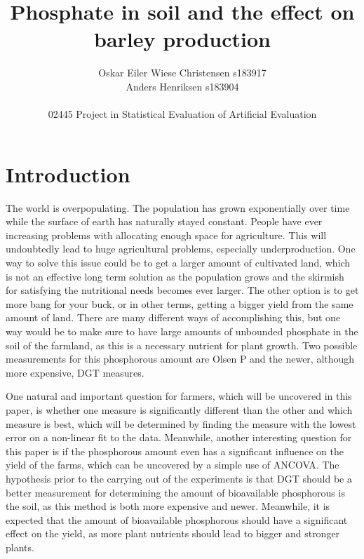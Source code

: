 \documentclass[11pt, fleqn, titlepage]{article}
\title{Phosphate in soil and the effect on barley production}
\author{Oskar Eiler Wiese Christensen s183917 \\ Anders Henriksen s183904 \\ \\ 02445 Project in Statistical Evaluation of Artificial Evaluation}
\date{\today \vspace{2.5cm} \section*{\small Summary} 
\justify{\footnotesize Farmers will need more effective agriculture as the population grows. This can be accomplished by optimizing the amount of bioavailable phosphorous in the soil. The purpose of this paper is to analyze two different measurements of phosphorous in the soil. The measurements are OlsenP and DGT. Furthermore, it is studied which measurement is better at describing the yield. A linear and non-linear Michaelis-Mentel model have been fit to the data to find the best possible measurement to use, and ANCOVA has been applied for finding the significance of phosphorous for the yield. These analyses have shown that DGT is the best of the two measurements and that phosphorous has a remarkably significant influence on the harvest yield. This shows that phosphorous measurements can be constructive in helping farmers estimate the yield. Meanwhile, when estimating this, DGT is the better of the measurements, though it also costs more, so farmers should take into consideration the cost-benefit of using DGT instead of OlsenP.}}
\begin{document}
\maketitle
\tableofcontents \newpage
\section{Introduction}
The world is overpopulating. The population has grown exponentially over time while the surface of earth has naturally stayed constant. People have ever increasing problems with allocating enough space for agriculture. This will undoubtedly lead to huge agricultural problems, especially underproduction. One way to solve this issue could be to get a larger amount of cultivated land, which is not an effective long term solution as the population grows and the skirmish for satisfying the nutritional needs becomes ever larger. The other option is to get more bang for your buck, or in other terms, getting a bigger yield from the same amount of land. There are many different ways of accomplishing this, but one way would be to make sure to have large amounts of unbounded phosphate in the soil of the farmland, as this is a necessary nutrient for plant growth. Two possible measurements for this phosphorous amount are Olsen P and the newer, although more expensive, DGT measures. 

One natural and important question for farmers, which will be uncovered in this paper, is whether one measure is significantly different than the other and which measure is best, which will be determined by finding the measure with the lowest error on a non-linear fit to the data. Meanwhile, another interesting question for this paper is if the phosphorous amount even has a significant influence on the yield of the farms, which can be uncovered by a simple use of ANCOVA. The hypothesis prior to the carrying out of the experiments is that DGT should be a better measurement for determining the amount of bioavailable phosphorous is the soil, as this method is both more expensive and newer. Meanwhile, it is expected that the amount of bioavailable phosphorous should have a significant effect on the yield, as more plant nutrients should lead to bigger and stronger plants.
\end{document}
